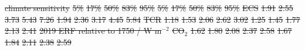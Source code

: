 \documentclass[gmd, manuscript]{copernicus}
\providecommand{\DIFadd}[1]{{\protect\color{blue}#1}} %
\providecommand{\DIFdel}[1]{{\protect\color{red}\sout{#1}}}                      %
\providecommand{\DIFaddFL}[1]{\DIFadd{#1}} %
\providecommand{\DIFdelFL}[1]{\DIFdel{#1}} %
\providecommand{\DIFaddbeginFL}{} %
\providecommand{\DIFaddendFL}{} %
\providecommand{\DIFdelbeginFL}{} %
\begin{document}
\begin{table}[t]
    \caption{\DIFaddFL{Constrained ensemble results for climate sensitivities and current ERF. ERF in 2019 is based on following an SSP2-4.5 pathway from 2014 onwards.}}
    \label{table:constrained_results}
    \DIFaddendFL {\DIFaddbeginFL \footnotesize
    
    \DIFaddendFL }
\DIFdelbeginFL %
\DIFdelFL{climate sensitivity }%
\DIFdelFL{5\% }%
\DIFdelFL{17\% }%
\DIFdelFL{50\% }%
\DIFdelFL{83\% }%
\DIFdelFL{95\% }%
\DIFdelFL{5\% }%
\DIFdelFL{17\% }%
\DIFdelFL{50\% }%
\DIFdelFL{83\% }%
\DIFdelFL{95\% }%
\DIFdelFL{ECS                 }%
\DIFdelFL{1.91 }%
\DIFdelFL{2.55 }%
\DIFdelFL{3.73 }%
\DIFdelFL{5.43 }%
\DIFdelFL{7.26 }%
\DIFdelFL{1.94 }%
\DIFdelFL{2.36 }%
\DIFdelFL{3.17 }%
\DIFdelFL{4.45 }%
\DIFdelFL{5.84 }%
\DIFdelFL{TCR                 }%
\DIFdelFL{1.18 }%
\DIFdelFL{1.53 }%
\DIFdelFL{2.06 }%
\DIFdelFL{2.62 }%
\DIFdelFL{3.02 }%
\DIFdelFL{1.25 }%
\DIFdelFL{1.45 }%
\DIFdelFL{1.77 }%
\DIFdelFL{2.13 }%
\DIFdelFL{2.41 }%
\DIFdelFL{2019 ERF relative to 1750 / W m$^{-2}$ }%
\DIFdelFL{CO$_2$ }%
\DIFdelFL{1.62 }%
\DIFdelFL{1.80 }%
\DIFdelFL{2.08 }%
\DIFdelFL{2.37 }%
\DIFdelFL{2.58 }%
\DIFdelFL{1.67 }%
\DIFdelFL{1.84 }%
\DIFdelFL{2.11 }%
\DIFdelFL{2.38 }%
\DIFdelFL{2.59 }%

\end{table}
\end{document}
